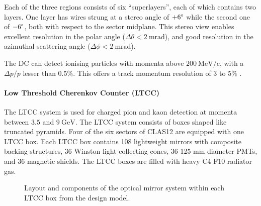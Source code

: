    Each of the three regions consists of six ``superlayers'', each of which contains two layers.
    One layer has wires strung at a stereo angle of $+6\degree$ while the second one of $-6\degree$, both with respect to the sector midplane.
    This stereo view enables excellent resolution in the polar angle ($\Delta\theta < 2 ~\text{mrad}$), and good resolution in the azimuthal scattering angle ($\Delta\phi < 2 ~\text{mrad}$).

    The DC can detect ionising particles with momenta above $200 ~\text{MeV}/\text{c}$, with a $\Delta p/p$ lesser than $0.5\%$.
    This offers a track momentum resolution of $3$ to $5\%$ \cite{mestayer2020}.

\paragraph{Low Threshold Cherenkov Counter (LTCC)}
    The LTCC system is used for charged pion and kaon detection at momenta between $3.5$ and $9 ~\text{GeV}$.
    The LTCC system consists of boxes shaped like truncated pyramids.
    Four of the six sectors of CLAS12 are equipped with one LTCC box.
    Each LTCC box contains 108 lightweight mirrors with composite backing structures, 36 Winston light-collecting cones, 36 125-mm diameter PMTs, and 36 magnetic shields.
    The LTCC boxes are filled with heavy C4 F10 radiator gas.

    \begin{figure}
        \centering{}
        \caption[LTCC Mirror System]{Layout and components of the optical mirror system within each LTCC box from the design model.}
        \label{fig::ltcc}
    \end{figure}

